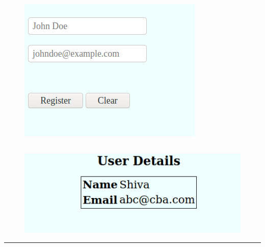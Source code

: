 \documentclass[12pt,letterpaper]{article}
\begin{document}
\subsubsection*{}
\begin{flushleft}

\end{flushleft}

\newpage
\subsection*{}
\begin{figure}[h]
    \centering
    \includegraphics[width = \textwidth]{OP1.png}
\end{figure}
\subsection*{}
\begin{figure}[h]
    \centering
    \includegraphics[width = \textwidth]{OP2.png}
\end{figure}
\hrule
\end{document}

